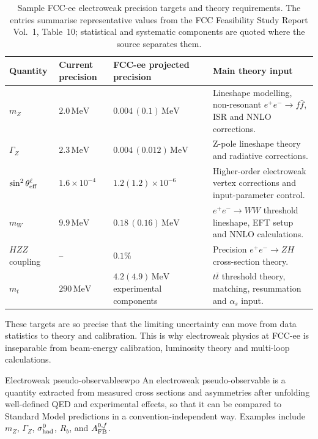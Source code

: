 \documentclass[11pt,a4paper]{article}
\newcommand{\mZ}{m_Z}
\newcommand{\gZ}{\Gamma_Z}
\numberwithin{equation}{section}
\begin{document}
\begin{table}[H]
\centering
\small
\caption{Sample FCC-ee electroweak precision targets and theory requirements. The entries summarise representative values from the FCC Feasibility Study Report Vol.~1, Table~10; statistical and systematic components are quoted where the source separates them.}
\label{tab:ew-precision-benchmarks}
\begin{tabularx}{\textwidth}{@{}p{2.3cm}p{2.25cm}p{2.7cm}X@{}}
\toprule
Quantity & Current precision & FCC-ee projected precision & Main theory input \\
\midrule
\(m_Z\) & \(2.0\,\mathrm{MeV}\) & \(0.004\,(0.1)\,\mathrm{MeV}\) & Lineshape modelling, non-resonant \(e^+e^-\to f\bar f\), ISR and NNLO corrections.\\
\(\Gamma_Z\) & \(2.3\,\mathrm{MeV}\) & \(0.004\,(0.012)\,\mathrm{MeV}\) & Z-pole lineshape theory and radiative corrections.\\
\(\sin^2\theta_{\rm eff}^{\ell}\) & \(1.6\times10^{-4}\) & \(1.2(1.2)\times10^{-6}\) & Higher-order electroweak vertex corrections and input-parameter control.\\
\(m_W\) & \(9.9\,\mathrm{MeV}\) & \(0.18\,(0.16)\,\mathrm{MeV}\) & \(e^+e^-\to WW\) threshold lineshape, EFT setup and NNLO calculations.\\
\(HZZ\) coupling & -- & \(0.1\%\) & Precision \(e^+e^-\to ZH\) cross-section theory.\\
\(m_t\) & \(290\,\mathrm{MeV}\) & \(4.2(4.9)\,\mathrm{MeV}\) experimental components & \(t\bar t\) threshold theory, matching, resummation and \(\alpha_s\) input.\\
\bottomrule
\end{tabularx}
\end{table}
These targets are so precise that the limiting uncertainty can move from data statistics to theory and calibration. This is why electroweak physics at FCC-ee is inseparable from beam-energy calibration, luminosity theory and multi-loop calculations.

\begin{definition}{Electroweak pseudo-observable}{ewpo}
An electroweak pseudo-observable is a quantity extracted from measured cross sections and asymmetries after unfolding well-defined QED and experimental effects, so that it can be compared to Standard Model predictions in a convention-independent way. Examples include \(\mZ\), \(\gZ\), \(\sigma^0_{\rm had}\), \(R_b\), and \(A_{\rm FB}^{0,f}\).
\end{definition}
\end{document}
